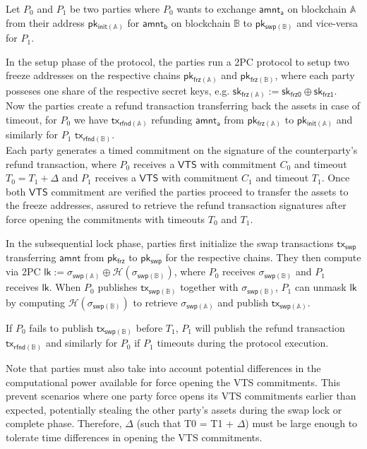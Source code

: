Let $P_0$ and $P_1$ be two parties where $P_0$ wants to exchange $\mathsf{amnt_a}$ on blockchain $\mathbb{A}$ from their address $\mathsf{pk_{init(\mathbb{A})}}$ for $\mathsf{amnt_b}$ on blockchain $\mathbb{B}$ to $\mathsf{pk_{swp(\mathbb{B})}}$ and vice-versa for $P_1$.

In the setup phase of the protocol, the parties run a 2PC protocol to setup two freeze addresses on the respective chains $\mathsf{pk_{frz(\mathbb{A})}}$ and $\mathsf{pk_{frz(\mathbb{B})}}$, where each party posseses one share of the respective secret keys, e.g. $\mathsf{sk_{frz(\mathbb{A})}} := \mathsf{sk_{frz0}} \oplus  \mathsf{sk_{frz1}}$. \\
Now the parties create a refund transaction transferring back the assets in case of timeout, for $P_0$ we have $\mathsf{tx_{rfnd(\mathbb{A})}}$ refunding $\mathsf{amnt_a}$ from $\mathsf{pk_{frz(\mathbb{A})}}$ to $\mathsf{pk_{init(\mathbb{A})}}$ and similarly for $P_1$ $\mathsf{tx_{rfnd(\mathbb{B})}}$. \\
Each party generates a timed commitment on the signature of the counterparty's refund transaction, where $P_0$ receives a $\mathsf{VTS}$ with commitment $C_0$ and timeout $T_0 = T_1 + \Delta$ and $P_1$ receives a $\mathsf{VTS}$ with commitment $C_1$ and timeout $T_1$. Once both $\mathsf{VTS}$ commitment are verified the parties proceed to transfer the assets to the freeze addresses, assured to retrieve the refund transaction signatures after force opening the commitments with timeouts $T_0$ and $T_1$.

In the subsequential lock phase, parties first initialize the swap transactions $\mathsf{tx_{swp}}$ transferring $\mathsf{amnt}$ from $\mathsf{pk_{frz}}$ to $\mathsf{pk_{swp}}$ for the respective chains. They then compute via 2PC $\mathsf{lk} := \sigma_{\mathsf{swp}(\mathbb{A})} \oplus \mathcal{H}(\sigma_{\mathsf{swp}(\mathbb{B})})$, where  $P_0$ receives $\sigma_{\mathsf{swp}(\mathbb{B})}$ and $P_1$ receives $\mathsf{lk}$.  When $P_0$ publishes $\mathsf{tx_{swp(\mathbb{B})}}$ together with  $\sigma_{\mathsf{swp}(\mathbb{B})}$, $P_1$ can unmask $\mathsf{lk}$ by computing $\mathcal{H}(\sigma_{\mathsf{swp}(\mathbb{B})})$ to retrieve $\sigma_{\mathsf{swp}(\mathbb{A})}$ and publish $\mathsf{tx_{swp(\mathbb{A})}}$.

 If $P_0$ fails to publish $\mathsf{tx_{swp(\mathbb{B})}}$ before $T_1$, $P_1$ will publish the refund transaction $\mathsf{tx_{rfnd(\mathbb{B})}}$ and similarly for $P_0$ if $P_1$ timeouts during the protocol execution.

Note that parties must also take into account potential differences in the computational power available for force opening the VTS commitments. This prevent scenarios where one party force opens its VTS commitments earlier than expected, potentially stealing 
 the other party's assets during the swap lock or complete phase. Therefore,  $\Delta$ (such that T0 = T1 + $\Delta$) must be large enough to tolerate time differences in opening the VTS commitments. \\
